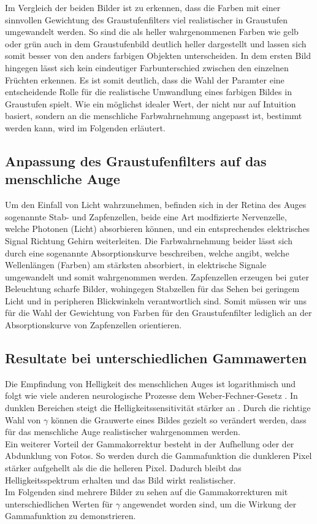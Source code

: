\documentclass[course=erap]{aspdoc}
\begin{document}
	Im Vergleich der beiden Bilder ist zu erkennen, dass die Farben mit einer sinnvollen Gewichtung des Graustufenfilters viel realistischer in Graustufen umgewandelt werden. So sind die als heller wahrgenommenen Farben wie gelb oder grün auch in dem Graustufenbild deutlich heller dargestellt und lassen sich somit besser von den anders farbigen Objekten unterscheiden. In dem ersten Bild hingegen lässt sich kein eindeutiger Farbunterschied zwischen den einzelnen Früchten erkennen. Es ist somit deutlich, dass die Wahl der Paramter eine entscheidende Rolle für die realistische Umwandlung eines farbigen Bildes in Graustufen spielt. Wie ein möglichst idealer Wert, der nicht nur auf Intuition basiert, sondern an die menschliche Farbwahrnehmung angepasst ist, bestimmt werden kann, wird im Folgenden erläutert.
	\subsection{Anpassung des Graustufenfilters auf das menschliche Auge}
	Um den Einfall von Licht wahrzunehmen, befinden sich in der Retina des Auges sogenannte Stab- und Zapfenzellen, beide eine Art modfizierte Nervenzelle, welche Photonen (Licht) absorbieren können, und ein entsprechendes elektrisches Signal Richtung Gehirn weiterleiten.
	Die Farbwahrnehmung beider lässt sich durch eine sogenannte Absorptionskurve beschreiben, welche angibt, welche Wellenlängen (Farben) am stärksten absorbiert, in elektrische Signale umgewandelt und somit wahrgenommen werden.
	Zapfenzellen erzeugen bei guter Beleuchtung scharfe Bilder, wohingegen Stabzellen für das Sehen bei geringem Licht und in peripheren Blickwinkeln verantwortlich sind. Somit müssen wir uns für die Wahl der Gewichtung von Farben für den Graustufenfilter lediglich an der Absorptionskurve von Zapfenzellen orientieren.
	
	\subsection{Resultate bei unterschiedlichen Gammawerten}
	Die Empfindung von Helligkeit des menschlichen Auges ist logarithmisch und folgt wie viele anderen neurologische Prozesse dem Weber-Fechner-Gesetz \cite{weberFechnerGesetz}. In dunklen Bereichen steigt die Helligkeitssensitivität stärker an \cite{Logarithmische_Helligkeitswahrnehmung}. Durch die richtige Wahl von $\gamma$ können die Grauwerte eines Bildes gezielt so verändert werden, dass für das menschliche Auge realistischer wahrgenommen werden. 
	\\
	\newline
	Ein weiterer Vorteil der Gammakorrektur besteht in der Aufhellung oder der Abdunklung von Fotos. So werden durch die Gammafunktion die dunkleren Pixel stärker aufgehellt als die die helleren Pixel. \cite{gammKorrekturWikipedia}
	Dadurch bleibt das Helligkeitsspektrum erhalten und das Bild wirkt realistischer. 
	\\
	\newline
	Im Folgenden sind mehrere Bilder zu sehen auf die Gammakorrekturen mit unterschiedlichen Werten für $\gamma$ angewendet worden sind, um die Wirkung der Gammafunktion zu demonstrieren.  
	
\end{document}
